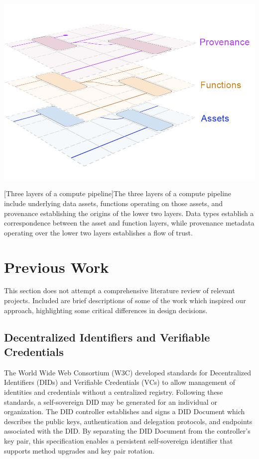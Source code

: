 \documentclass[9pt, oneside]{article}   	%
\begin{document}
\begin{multicols}{2}
\begin{center}
\includegraphics[width=1\columnwidth]{Fig1_assets_20230715}
\begin{flushright}
[Three layers of a compute pipeline]{The three layers of a compute pipeline include underlying data assets, functions operating on those assets, and provenance establishing the origins of the lower two layers. Data types establish a correspondence between the asset and function layers, while provenance metadata operating over the lower two layers establishes a flow of trust.}
\label{layeredDataFig1}
\end{flushright}
\end{center}

\section{Previous Work}\label{PrevWork}

This section does not attempt a comprehensive literature review of relevant projects. Included are brief descriptions of some of the work which inspired our approach, highlighting some critical differences in design decisions.

\subsection{Decentralized Identifiers and Verifiable Credentials}\label{did-vc}

The World Wide Web Consortium (W3C) developed standards for Decentralized Identifiers (DIDs) and Verifiable Credentials (VCs) to allow management of identities and credentials without a centralized registry. Following these standards, a self-sovereign DID may be generated for an individual or organization. The DID controller establishes and signs a DID Document which describes the public keys, authentication and delegation protocols, and endpoints associated with the DID. By separating the DID Document from the controller's key pair, this specification enables a persistent self-sovereign identifier that supports method upgrades and key pair rotation. \cite{w3cDID}


\end{multicols}
\end{document}
